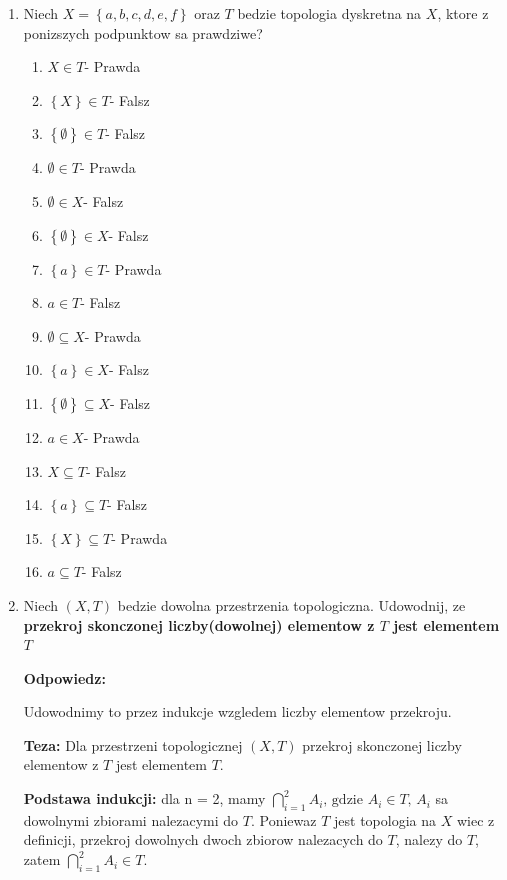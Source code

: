 \documentclass{article}
\begin{document}
\begin{enumerate}
    \item Niech $X = \left\{a,b,c,d,e,f\right\}$ oraz $T$ bedzie topologia dyskretna na $X$, ktore z ponizszych podpunktow sa prawdziwe?

        \begin{enumerate}[label=(\alph*)]
            \item $X \in T$- Prawda
            \item $\left\{X\right\} \in T$- Falsz
            \item $\left\{ \emptyset\right\} \in T$- Falsz
            \item $\emptyset \in T$- Prawda
            \item $\emptyset \in X$- Falsz 
            \item $\left\{ \emptyset\right\} \in X$- Falsz
            \item $\left\{a \right\} \in T$- Prawda
            \item $a  \in T$- Falsz
            \item $\emptyset \subseteq X$- Prawda
            \item $\left\{a \right\} \in X$- Falsz
            \item $\left\{\emptyset \right\} \subseteq X$- Falsz
            \item $a \in X$- Prawda
            \item $X \subseteq T$- Falsz
            \item $\left\{a \right\} \subseteq T$- Falsz
            \item $\left\{X\right\} \subseteq T$- Prawda
            \item $a \subseteq T$- Falsz
        \end{enumerate}

    \item Niech $(X, T)$ bedzie dowolna przestrzenia topologiczna. Udowodnij, ze \textbf{przekroj skonczonej liczby(dowolnej) elementow z $T$ jest elementem $T$}

        \textbf{Odpowiedz:}

        Udowodnimy to przez indukcje wzgledem liczby elementow przekroju.

        \textbf{Teza:} Dla przestrzeni topologicznej $(X,T)$ przekroj skonczonej liczby elementow z $T$ jest elementem $T$.

        \textbf{Podstawa indukcji:} dla n = 2, mamy $\bigcap\limits_{i = 1}^{2}A_{i} \text{, gdzie } A_{i} \in T \text{, } A_{i}$ sa dowolnymi zbiorami nalezacymi do $T$. Poniewaz $T$ jest topologia na $X$ wiec z definicji, przekroj dowolnych dwoch zbiorow nalezacych do $T$, nalezy do $T$, zatem $\bigcap\limits_{i = 1}^{2}A_{i} \in T$.


\end{enumerate}
\end{document}
